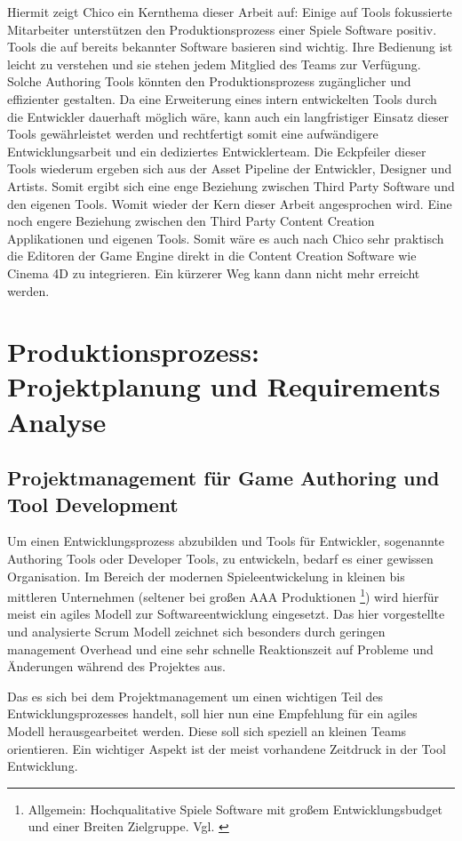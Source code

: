 \documentclass[pagesize, paper=a4, fontsize=12pt, titlepage=true, headings=small, headnosepline, abstractoff, liststotoc, nochapterprefix, plainheadsepline, twoside]{scrreprt}
\begin{document}
Hiermit zeigt Chico ein Kernthema dieser Arbeit auf: Einige auf Tools fokussierte Mitarbeiter unterstützen den Produktionsprozess einer Spiele Software positiv. Tools die auf bereits bekannter Software basieren sind wichtig. Ihre Bedienung ist leicht zu verstehen und sie stehen jedem Mitglied des Teams zur Verfügung. Solche Authoring Tools könnten den Produktionsprozess zugänglicher und effizienter gestalten. Da eine Erweiterung eines intern entwickelten Tools durch die Entwickler dauerhaft möglich wäre, kann auch ein langfristiger Einsatz dieser Tools gewährleistet werden und rechtfertigt somit eine aufwändigere Entwicklungsarbeit und ein dediziertes Entwicklerteam. Die Eckpfeiler dieser Tools wiederum ergeben sich aus der Asset Pipeline der Entwickler, Designer und Artists. Somit ergibt sich eine enge Beziehung zwischen Third Party Software und den eigenen Tools. Womit wieder der Kern dieser Arbeit angesprochen wird. Eine noch engere Beziehung zwischen den Third Party Content Creation Applikationen und eigenen Tools. Somit wäre es auch nach Chico sehr praktisch die Editoren der Game Engine direkt in die Content Creation Software wie Cinema 4D zu integrieren. Ein kürzerer Weg kann dann nicht mehr erreicht werden.

\chapter{Produktionsprozess: Projektplanung und Requirements Analyse}
\section{Projektmanagement für Game Authoring und Tool Development}
Um einen Entwicklungsprozess abzubilden und Tools für Entwickler, sogenannte Authoring Tools oder Developer Tools, zu entwickeln, bedarf es einer gewissen Organisation. Im Bereich der modernen Spieleentwickelung in kleinen bis mittleren Unternehmen (seltener bei großen AAA Produktionen \footnote{Allgemein: Hochqualitative Spiele Software mit großem Entwicklungsbudget und einer Breiten Zielgruppe. Vgl. \cite{GamasutraAAA2005} }) wird hierfür meist ein agiles Modell zur Softwareentwicklung eingesetzt. Das hier vorgestellte und analysierte Scrum Modell zeichnet sich besonders durch geringen management Overhead und eine sehr schnelle Reaktionszeit auf Probleme und Änderungen während des Projektes aus.

Das es sich bei dem Projektmanagement um einen wichtigen Teil des Entwicklungsprozesses handelt, soll hier nun eine Empfehlung für ein agiles Modell herausgearbeitet werden. Diese soll sich speziell an kleinen Teams orientieren. Ein wichtiger Aspekt ist der meist vorhandene Zeitdruck in der Tool Entwicklung. 
\end{document}

